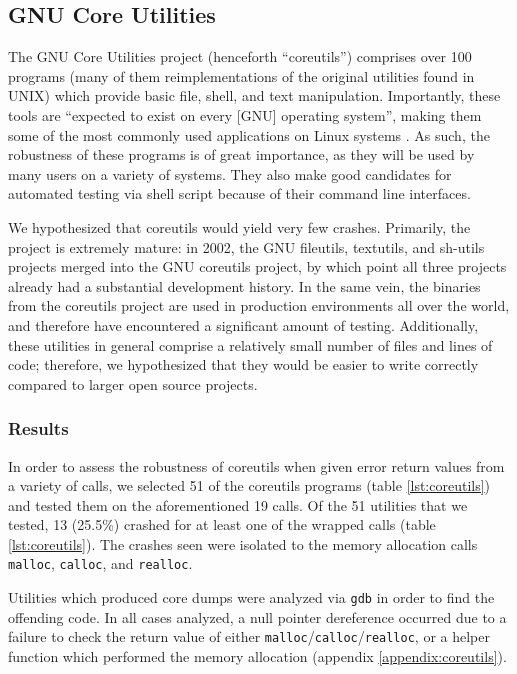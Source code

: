 \subsection{GNU Core Utilities}
The GNU Core Utilities project (henceforth ``coreutils'') comprises over 100 programs (many of them reimplementations of the original utilities found in UNIX) which provide basic file, shell, and text manipulation. Importantly, these tools are ``expected to exist on every [GNU] operating system'', making them some of the most commonly used applications on Linux systems \cite{coreutils}. As such, the robustness of these programs is of great importance, as they will be used by many users on a variety of systems. They also make good candidates for automated testing via shell script because of their command line interfaces.

We hypothesized that coreutils would yield very few crashes. Primarily, the project is extremely mature: in 2002, the GNU fileutils, textutils, and sh-utils projects merged into the GNU coreutils project, by which point all three projects already had a substantial development history. In the same vein, the binaries from the coreutils project are used in production environments all over the world, and therefore have encountered a significant amount of testing. Additionally, these utilities in general comprise a relatively small number of files and lines of code; therefore, we hypothesized that they would be easier to write correctly compared to larger open source projects.

\subsubsection{Results}
In order to assess the robustness of coreutils when given error return values from a variety of calls, we selected 51 of the coreutils programs (table \ref{lst:coreutils}) and tested them on the aforementioned 19 calls. Of the 51 utilities that we tested, 13 (25.5\%) crashed for at least one of the wrapped calls (table \ref{lst:coreutils}). The crashes seen were isolated to the memory allocation calls \texttt{malloc}, \texttt{calloc}, and \texttt{realloc}. 

Utilities which produced core dumps were analyzed via \texttt{gdb} in order to find the offending code. In all cases analyzed, a null pointer dereference occurred due to a failure to check the return value of either \texttt{malloc}/\texttt{calloc}/\texttt{realloc}, or a helper function which performed the memory allocation (appendix \ref{appendix:coreutils}).

